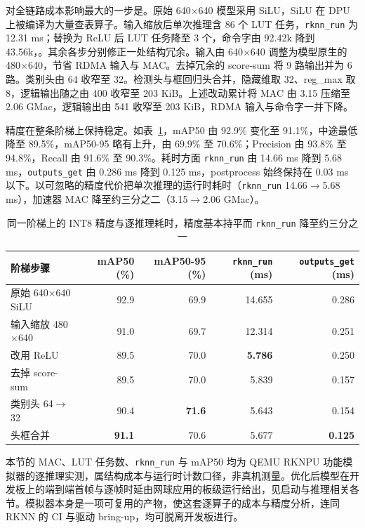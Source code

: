 对全链路成本影响最大的一步是。原始 640$\times$640 模型采用 SiLU，SiLU 在 DPU 上被编译为大量查表算子。输入缩放后单次推理含 86 个 LUT 任务，\texttt{rknn\_run} 为 12.31 ms；替换为 ReLU 后 LUT 任务降至 3 个，命令字由 92.42k 降到 43.56k，。其余各步分别修正一处结构冗余。输入由 640$\times$640 调整为模型原生的 480$\times$640，节省 RDMA 输入与 MAC。去掉冗余的 score-sum 将 9 路输出并为 6 路。类别头由 64 收窄至 32。检测头与框回归头合并，隐藏维取 32、reg\_max 取 8，逻辑输出随之由 400 收窄至 203 KiB。上述改动累计将 MAC 由 3.15 压缩至 2.06 GMac，逻辑输出由 541 收窄至 203 KiB，RDMA 输入与命令字一并下降。

精度在整条阶梯上保持稳定。如表~\ref{tab:npu-accuracy}，mAP50 由 92.9\% 变化至 91.1\%，中途最低降至 89.5\%，mAP50-95 略有上升，由 69.9\% 至 70.6\%；Precision 由 93.8\% 至 94.8\%，Recall 由 91.6\% 至 90.3\%。耗时方面 \texttt{rknn\_run} 由 14.66 ms 降到 5.68 ms，\texttt{outputs\_get} 由 0.286 ms 降到 0.125 ms，postprocess 始终保持在 0.03 ms 以下。以可忽略的精度代价把单次推理的运行时耗时（\texttt{rknn\_run} 14.66$\to$5.68 ms），加速器 MAC 降至约三分之二（3.15$\to$2.06 GMac）。

\begin{table}[H]\centering\small
\begin{tabular}{@{}lrrrr@{}}
\toprule
阶梯步骤 & mAP50 (\%) & mAP50-95 (\%) & \texttt{rknn\_run} (ms) & \texttt{outputs\_get} (ms) \\
\midrule
原始 640$\times$640 SiLU & 92.9 & 69.9 & 14.655 & 0.286 \\
输入缩放 480$\times$640 & 91.0 & 69.7 & 12.314 & 0.251 \\
改用 ReLU & 89.5 & 70.0 & \textbf{5.786} & 0.250 \\
去掉 score-sum & 89.5 & 70.0 & 5.839 & 0.157 \\
类别头 64$\to$32 & 90.4 & \textbf{71.6} & 5.643 & 0.154 \\
头框合并 & \textbf{91.1} & 70.6 & 5.677 & \textbf{0.125} \\
\bottomrule
\end{tabular}
\caption{同一阶梯上的 INT8 精度与逐推理耗时，精度基本持平而 \texttt{rknn\_run} 降至约三分之一}
\label{tab:npu-accuracy}
\end{table}


本节的 MAC、LUT 任务数、\texttt{rknn\_run} 与 mAP50 均为 QEMU RKNPU 功能模拟器的逐推理实测，属结构成本与运行时计数口径，非真机测量。优化后模型在开发板上的端到端首帧与逐帧时延由网球应用的板级运行给出，见启动与推理相关各节。模拟器本身是一项可复用的产物，使这套逐算子的成本与精度分析，连同 RKNN 的 CI 与驱动 bring-up，均可脱离开发板进行。

